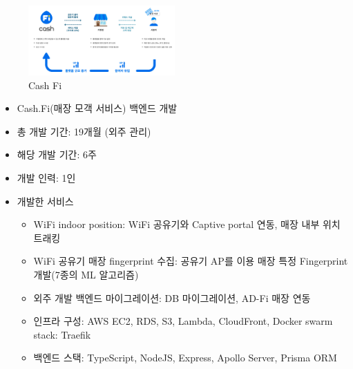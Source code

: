
\begin{figure}[!ht]
	\begin{fullwidth}
		\parbox{1.6\textwidth}{
			\centering
			\includegraphics[width=0.5\textwidth]{images/cash-fi.png}
			\caption*{Cash Fi}
		}
	\end{fullwidth}
\end{figure}
\begin{itemize}[label=]
	\item Cash.Fi(매장 모객 서비스) 백엔드 개발
	\item 총 개발 기간: 19개월 (외주 관리)
	\item 해당 개발 기간: 6주
	\item 개발 인력: 1인
	\item 개발한 서비스
	      \begin{itemize}[label=]
		      \item WiFi indoor position: WiFi 공유기와 Captive portal 연동, 매장 내부 위치 트래킹
		      \item WiFi 공유기 매장 fingerprint 수집: 공유기 AP를 이용 매장 특정 Fingerprint 개발(7종의 ML 알고리즘)
		      \item 외주 개발 백엔드 마이그레이션: DB 마이그레이션, AD-Fi 매장 연동
		      \item 인프라 구성: AWS EC2, RDS, S3, Lambda, CloudFront, Docker swarm stack: Traefik
		      \item 백엔드 스택: TypeScript, NodeJS, Express, Apollo Server, Prisma ORM
	      \end{itemize}

\end{itemize}